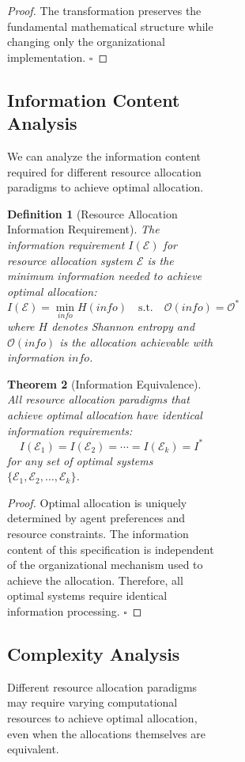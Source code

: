 \documentclass[12pt,a4paper]{article}
\newtheorem{theorem}{Theorem}
\newtheorem{definition}[theorem]{Definition}
\begin{document}
\begin{figure}[H]
\begin{figure}[H]
\begin{figure}[H]
\begin{proof}
The transformation preserves the fundamental mathematical structure while changing only the organizational implementation. $\square$
\end{proof}

\subsection{Information Content Analysis}

We can analyze the information content required for different resource allocation paradigms to achieve optimal allocation.

\begin{definition}[Resource Allocation Information Requirement]
The information requirement $I(\mathcal{E})$ for resource allocation system $\mathcal{E}$ is the minimum information needed to achieve optimal allocation:
\begin{equation}
I(\mathcal{E}) = \min_{info} H(info) \quad \text{s.t.} \quad \mathcal{O}(info) = \mathcal{O}^*
\end{equation}
where $H$ denotes Shannon entropy and $\mathcal{O}(info)$ is the allocation achievable with information $info$.
\end{definition}

\begin{theorem}[Information Equivalence]
All resource allocation paradigms that achieve optimal allocation have identical information requirements:
\begin{equation}
I(\mathcal{E}_1) = I(\mathcal{E}_2) = \cdots = I(\mathcal{E}_k) = I^*
\end{equation}
for any set of optimal systems $\{\mathcal{E}_1, \mathcal{E}_2, \ldots, \mathcal{E}_k\}$.
\end{theorem}

\begin{proof}
Optimal allocation is uniquely determined by agent preferences and resource constraints. The information content of this specification is independent of the organizational mechanism used to achieve the allocation. Therefore, all optimal systems require identical information processing. $\square$
\end{proof}

\subsection{Complexity Analysis}

Different resource allocation paradigms may require varying computational resources to achieve optimal allocation, even when the allocations themselves are equivalent.


\end{figure}
\end{figure}
\end{figure}
\end{document}
